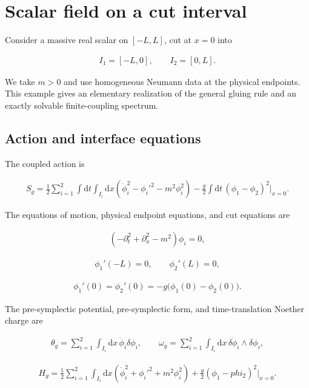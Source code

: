\section{Scalar field on a cut interval}\label{sec:interval-scalar}

Consider a massive real scalar on $[-L,L]$, cut at $x=0$ into

\begin{align}
I_1=[-L,0],
\qquad
I_2=[0,L].
\end{align}

We take $m>0$ and use homogeneous Neumann data at the physical endpoints. This example gives an elementary realization of the general gluing rule and an exactly solvable finite-coupling spectrum.

\subsection{Action and interface equations}\label{subsec:interval-action}

The coupled action is

\begin{align}
S_g
=\frac12\sum_{i=1}^2\int\mathrm dt\int_{I_i}\mathrm dx
\left(\dot\phi_i^2-\phi_i'^2-m^2\phi_i^2\right)
-\frac g2\int\mathrm dt\,(\phi_1-\phi_2)^2\big|_{x=0}.
\end{align}

The equations of motion, physical endpoint equations, and cut equations are

\begin{align}
(-\partial_t^2+\partial_x^2-m^2)\phi_i=0,
\end{align}

\begin{align}
\phi_1'(-L)=0,
\qquad
\phi_2'(L)=0,
\end{align}

\begin{align}
\phi_1'(0)=\phi_2'(0)
=-g\bigl(\phi_1(0)-\phi_2(0)\bigr).
\end{align}

The pre-symplectic potential, pre-symplectic form, and time-translation Noether charge are

\begin{align}
\theta_g=\sum_{i=1}^2\int_{I_i}\mathrm dx\,\dot\phi_i\delta\phi_i,
\qquad
\omega_g=\sum_{i=1}^2\int_{I_i}\mathrm dx\,
\delta\dot\phi_i\wedge\delta\phi_i,
\end{align}

\begin{align}
H_g
=\frac12\sum_{i=1}^2\int_{I_i}\mathrm dx
\left(\dot\phi_i^2+\phi_i'^2+m^2\phi_i^2\right)
+\frac g2(\phi_1-phi_2)^2\big|_{x=0}.
\end{align}

